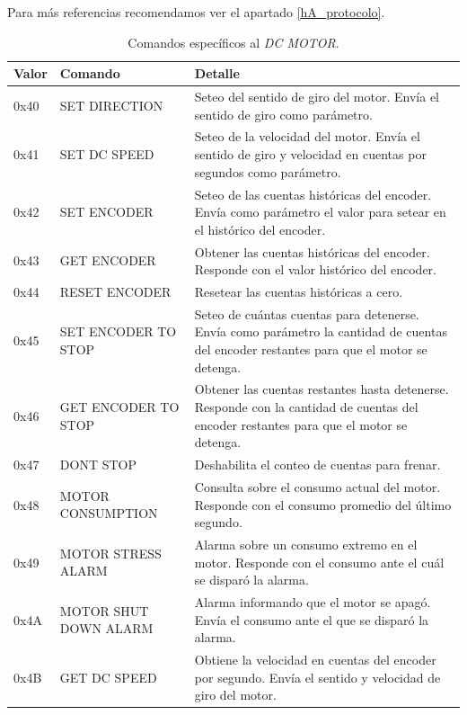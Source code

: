 Para m\'as referencias recomendamos ver el apartado \ref{hA_protocolo}.

\begin{table}
	\begin{center}
		\begin{tabular}{|l|p{2.5cm}|p{7.5cm}|}
		\hline
		Valor & Comando & Detalle \\
		\hline
		0x40 & SET DIRECTION & Seteo del sentido de giro del motor.
		Env\'ia el sentido de giro como par\'ametro. \\
		\hline
		0x41 & SET DC SPEED & Seteo de la velocidad del motor.
		Env\'ia el sentido de giro y velocidad en cuentas por segundos como par\'ametro. \\
		\hline
		0x42 & SET ENCODER & Seteo de las cuentas hist\'oricas del encoder.
		Env\'ia como par\'ametro el valor para setear en el hist\'orico del encoder. \\
		\hline
		0x43 & GET ENCODER & Obtener las cuentas hist\'oricas del encoder.
		Responde con el valor hist\'orico del encoder. \\
		\hline
		0x44 & RESET ENCODER & Resetear las cuentas hist\'oricas a cero. \\
		\hline
		0x45 & SET ENCODER TO STOP & Seteo de cu\'antas cuentas para detenerse.
		Env\'ia como par\'ametro la cantidad de cuentas del encoder restantes para
		que el motor se detenga. \\
		\hline
		0x46 & GET ENCODER TO STOP & Obtener las cuentas restantes hasta detenerse.
		Responde con la cantidad de cuentas del encoder restantes para que el motor se detenga. \\
		\hline
		0x47 & DONT STOP & Deshabilita el conteo de cuentas para frenar. \\
		\hline
		0x48 & MOTOR CONSUMPTION & Consulta sobre el consumo actual del motor.
		Responde con el consumo promedio del \'ultimo segundo. \\
		\hline
		0x49 & MOTOR STRESS ALARM & Alarma sobre un consumo extremo en el motor.
		Responde con el consumo ante el cu\'al se dispar\'o la alarma. \\
		\hline
		0x4A & MOTOR SHUT DOWN ALARM & Alarma informando que el motor se apag\'o.
		Env\'ia el consumo ante el que se dispar\'o la alarma. \\
		\hline
		0x4B & GET DC SPEED & Obtiene la velocidad en cuentas del encoder por segundo.
		Env\'ia el sentido y velocidad de giro del motor. \\
		\hline
		\end{tabular}
		\caption{Comandos espec\'ificos al \emph{DC MOTOR}.}
		\label{hT_comm_comandos_motordc}
	\end{center}
\end{table}

